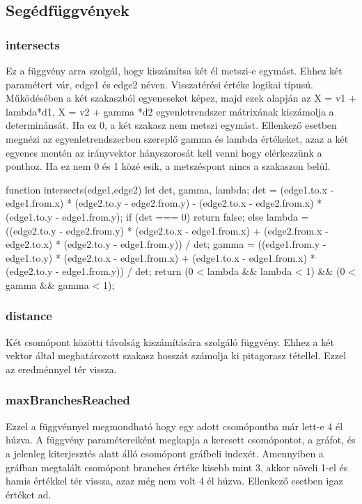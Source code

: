 \subsection{Segédfüggvények}
\subsubsection{intersects}
Ez a függvény arra szolgál, hogy kiszámítsa két él metszi-e egymást. Ehhez két paramétert vár, edge1 és edge2 néven. Visszatérési értéke logikai típusú.
Működésében a két szakaszból egyeneseket képez, majd ezek alapján az X = v1 + lambda*d1, X = v2 + gamma *d2 egyenletrendszer mátrixának kiszámolja a determinánsát. Ha ez 0, a két szakasz nem metszi egymást.
Ellenkező esetben megnézi az egyenletrendszerben szereplő gamma és lambda értékeket, azaz a két egyenes mentén az irányvektor hányszorosát kell venni hogy elérkezzünk a ponthoz. Ha ez nem 0 és 1 közé esik, a metszéspont nincs a szakaszon belül.
\begin{cpp}
function intersects(edge1,edge2) {
    let det, gamma, lambda;
    det = (edge1.to.x - edge1.from.x) * (edge2.to.y - edge2.from.y) - 
    (edge2.to.x - edge2.from.x) * (edge1.to.y - edge1.from.y);
    if (det === 0) {
        return false;
    } else {
        lambda = ((edge2.to.y - edge2.from.y) * (edge2.to.x - edge1.from.x)
         + (edge2.from.x - edge2.to.x) * (edge2.to.y - edge1.from.y)) / det;
        gamma = ((edge1.from.y - edge1.to.y) * (edge2.to.x - edge1.from.x)
         + (edge1.to.x - edge1.from.x) * (edge2.to.y - edge1.from.y)) / det;
        return (0 < lambda && lambda < 1) && (0 < gamma && gamma < 1);
    }
}
\end{cpp}
\subsubsection{distance}
Két csomópont közötti távolság kiszámítására szolgáló függvény. Ehhez a két vektor által meghatározott szakasz hosszát számolja ki pitagorasz tétellel. Ezzel az eredménnyel tér vissza.
\subsubsection{maxBranchesReached}
Ezzel a függvénnyel megmondható hogy egy adott csomópontba már lett-e 4 él húzva. A függvény paramétereiként megkapja a keresett csomópontot, a gráfot, és a jelenleg kiterjesztés alatt álló csomópont gráfbeli indexét. Amennyiben a gráfban megtalált csomópont branches értéke kisebb mint 3, akkor növeli 1-el és hamis értékkel tér vissza, azaz még nem volt 4 él húzva. Ellenkező esetben igaz értéket ad.
